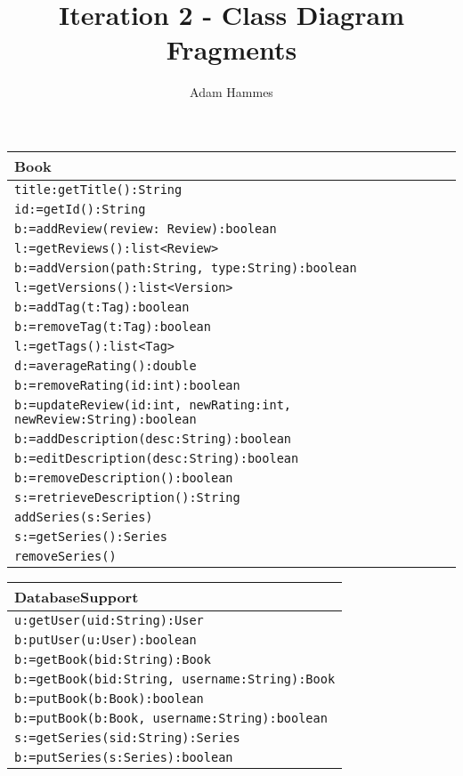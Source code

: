 \documentclass[12pt]{article}
\title{\vspace{1in}Iteration 2 - Class Diagram Fragments}
\author{Adam Hammes}
\begin{document}
\maketitle

\begin{tabular}{| l |}
    \hline
    Book\\
    \hline
    \texttt{title:getTitle():String}\\
    \texttt{id:=getId():String}\\
    \texttt{b:=addReview(review: Review):boolean}\\
    \texttt{l:=getReviews():list<Review>}\\
    \texttt{b:=addVersion(path:String, type:String):boolean}\\
    \texttt{l:=getVersions():list<Version>}\\
    \texttt{b:=addTag(t:Tag):boolean}\\
    \texttt{b:=removeTag(t:Tag):boolean}\\
    \texttt{l:=getTags():list<Tag>}\\
    \texttt{d:=averageRating():double}\\
    \texttt{b:=removeRating(id:int):boolean}\\
    \texttt{b:=updateReview(id:int, newRating:int, newReview:String):boolean}\\
    \texttt{b:=addDescription(desc:String):boolean}\\
    \texttt{b:=editDescription(desc:String):boolean}\\
    \texttt{b:=removeDescription():boolean}\\
    \texttt{s:=retrieveDescription():String}\\
    \texttt{addSeries(s:Series)}\\
    \texttt{s:=getSeries():Series}\\
    \texttt{removeSeries()}\\
    \hline
\end{tabular}

\vspace{1cm}

\begin{tabular}{| l |}
    \hline
    DatabaseSupport\\
    \hline
    \texttt{u:getUser(uid:String):User}\\
    \texttt{b:putUser(u:User):boolean}\\
    \texttt{b:=getBook(bid:String):Book}\\
    \texttt{b:=getBook(bid:String, username:String):Book}\\
    \texttt{b:=putBook(b:Book):boolean}\\
    \texttt{b:=putBook(b:Book, username:String):boolean}\\
    \texttt{s:=getSeries(sid:String):Series}\\
        \texttt{b:=putSeries(s:Series):boolean}\\
    \hline
\end{tabular}
\vspace{1cm}
\end{document}
